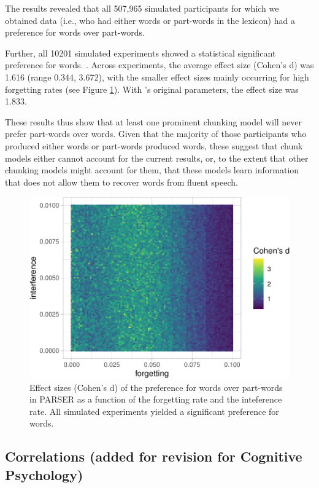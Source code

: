 \documentclass[
]{article}
\begin{document}
The results revealed that all 507,965 simulated participants for which
we obtained data (i.e., who had either words or part-words in the
lexicon) had a preference for words over part-words.

Further, all 10201 simulated experiments showed a statistical
significant preference for words. . Across experiments, the average
effect size (Cohen's d) was 1.616 (range 0.344, 3.672), with the smaller
effect sizes mainly occurring for high forgetting rates (see Figure
\ref{fig:parser-plot-d}). With \citep{Perruchet1998}'s original
parameters, the effect size was 1.833.

These results thus show that at least one prominent chunking model will
never prefer part-words over words. Given that the majority of those
participants who produced either words or part-words produced words,
these suggest that chunk models either cannot account for the current
results, or, to the extent that other chunking models might account for
them, that these models learn information that does not allow them to
recover words from fluent speech.

\begin{figure}

{\centering \includegraphics[width=0.8\linewidth]{segmentation_recall_combined_for_revision3_files/figure-latex/parser-plot-d-1} 

}

\caption{Effect sizes (Cohen's d) of the preference for words over part-words in PARSER as a function of the forgetting rate and the inteference rate. All simulated experiments yielded a significant preference for words.}\label{fig:parser-plot-d}
\end{figure}

\clearpage

\subsection{Correlations (added for revision for Cognitive
Psychology)}\label{correlations-added-for-revision-for-cognitive-psychology}
\end{document}
